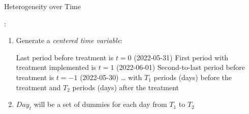 \begin{frame}{Heterogeneity over Time}


\textcite{Huntington2022}:

\begin{enumerate}
    \item Generate a \textit{centered time variable}:
    \begin{outline}
        \1 Last period before treatment is $t=0$ (2022-05-31)
        \1 First period with treatment implemented is $t=1$ (2022-06-01)
        \1 Second-to-last period before treatment is $t=-1$ (2022-05-30)
        \1 …
        \1 with $T_{1}$ periods (days) before the treatment and $T_{2}$ periods (days) after the treatment
    \end{outline} 
    \item $Day_{t}$ will be a set of dummies for each day from $T_{1}$ to $T_{2}$
\end{enumerate}








    
\end{frame}








